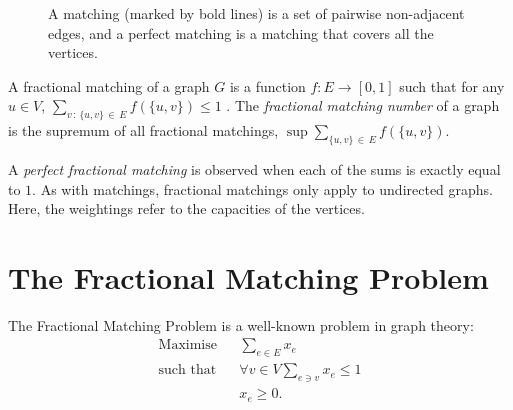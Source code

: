 \begin{figure}[ht]
     \centering
     \hspace{.3in}
     \caption[Matching and perfect matching on a graph]{A matching (marked by bold lines)  is a set of pairwise non-adjacent edges, and a perfect matching  is a matching that covers all the vertices.}
\end{figure}

A fractional matching of a graph $G$ is a function $f : E \rightarrow [0, 1]$ such that for any $u \in V$, $\sum_{v \, : \, \{ u, v \} \, \in \, E} f( \{ u, v \} ) \leq 1$ \cite{liuy2002}. The \emph{fractional matching number} of a graph is the supremum of all fractional matchings, $\sup \sum_{ \{ u, v \} \, \in \, E} f( \{ u, v \} )$.

A \emph{perfect fractional matching} is observed when each of the sums is exactly equal to $1$. As with matchings, fractional matchings only apply to undirected graphs. Here, the weightings refer to the capacities of the vertices.

\section{The Fractional Matching Problem}

The Fractional Matching Problem is a well-known problem in graph theory:
\begin{eqnarray*}
  \mbox{Maximise} && \sum_{e \in E} x_e \\
  \mbox{such that} && \forall v \in V \sum_{e \ni v} x_e \leq 1 \\
  && x_e \geq 0.
\end{eqnarray*}

